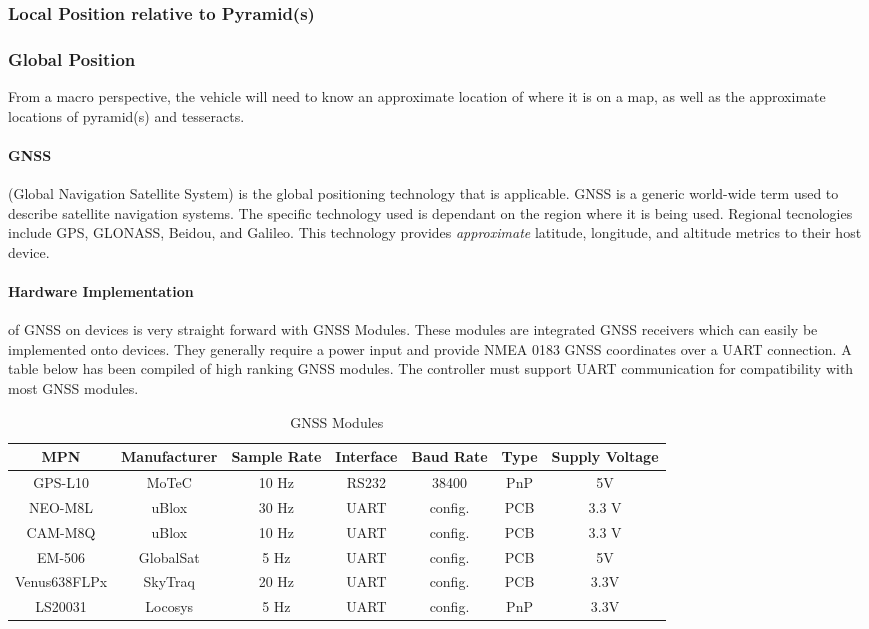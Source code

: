 \documentclass[12pt]{article}
\begin{document}
\subsubsection{Local Position relative to Pyramid(s)}
\subsubsection{Global Position}
From a macro perspective, the vehicle will need to know an approximate location of where it is on a map, as well as the approximate locations of pyramid(s) and tesseracts. 

\paragraph{GNSS} (Global Navigation Satellite System) is the global positioning technology that is applicable. GNSS is a generic world-wide term used to describe satellite navigation systems. The specific technology used is dependant on the region where it is being used. Regional tecnologies include GPS, GLONASS, Beidou, and Galileo.  This technology provides \textit{approximate} latitude, longitude, and altitude metrics to their host device. 

\paragraph{Hardware Implementation} of GNSS on devices is very straight forward with GNSS Modules. These modules are integrated GNSS receivers which can easily be implemented onto devices. They generally require a power input and provide NMEA 0183 GNSS coordinates over a UART connection. A table below has been compiled of high ranking GNSS modules. The controller must support UART communication for compatibility with most GNSS modules.

\begin{table}[htbp]
  \centering
  \caption{GNSS Modules}
    \begin{tabular}{c|c|c|c|c|c|c}
    MPN   & Manufacturer & Sample Rate & Interface & Baud Rate & Type& Supply Voltage \\
    \midrule
    GPS-L10 & MoTeC & 10 Hz & RS232 & 38400 &     PnP  & 5V \\
    NEO-M8L & uBlox & 30 Hz & UART  & config. &    PCB   & 3.3 V \\
    CAM-M8Q & uBlox & 10 Hz & UART  & config. & PCB & 3.3 V \\
    EM-506 & GlobalSat & 5 Hz & UART  & config. & PCB & 5V \\
    Venus638FLPx & SkyTraq & 20 Hz & UART  & config. & PCB & 3.3V \\
    LS20031 & Locosys & 5 Hz  & UART  & config. & PnP & 3.3V \\
    \end{tabular}%
  \label{tab:addlabel}%
\end{table}%
\end{document}
